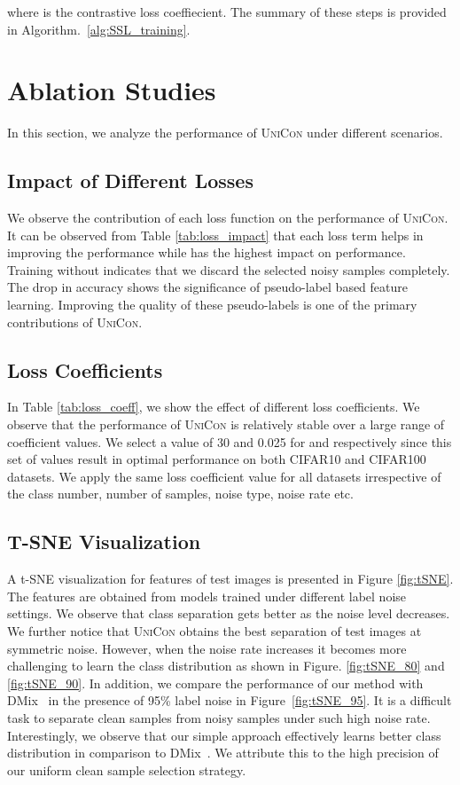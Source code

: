 \documentclass[10pt,twocolumn,letterpaper]{article}
\begin{document}
where  is the contrastive loss coeffiecient. The summary of these steps is provided in Algorithm.~\ref{alg:SSL_training}.

\section{Ablation Studies} \label{sec:ablation_studies}
In this section, we analyze the performance of \textsc{UniCon} under different scenarios.

\subsection{Impact of Different Losses}
We observe the contribution of each loss function on the performance of \textsc{UniCon}. It can be observed from Table \ref{tab:loss_impact} that each loss term helps in improving the performance while  has the highest impact on performance. Training without  indicates that we discard the selected noisy samples completely. The drop in accuracy shows the significance of pseudo-label based feature learning. Improving the quality of these pseudo-labels is one of the primary contributions of \textsc{UniCon}.    



\subsection{Loss Coefficients}
In Table \ref{tab:loss_coeff}, we show the effect of different loss coefficients. We observe that the performance of \textsc{UniCon} is relatively stable over a large range of coefficient values. We select a value of 30 and 0.025 for  and  respectively since this set of values result in optimal performance on both CIFAR10 and CIFAR100 datasets. We apply the same loss coefficient value for all datasets irrespective of the class number, number of samples, noise type, noise rate etc.    



\subsection{T-SNE Visualization}
A t-SNE visualization\cite{van2008visualizing} for features of test images is presented in Figure \ref{fig:tSNE}. The features are obtained from models trained under different label noise settings. We observe that class separation gets better as the noise level decreases. We further notice that \textsc{UniCon} obtains the best separation of test images at symmetric  noise. However, when the noise rate increases it becomes more challenging to learn the class distribution as shown in Figure. \ref{fig:tSNE_80} and \ref{fig:tSNE_90}. In addition, we compare the performance of our method with DMix~\cite{li2020dividemix} in the presence of 95\% label noise in Figure~\ref{fig:tSNE_95}. It is a difficult task to separate clean samples from noisy samples under such high noise rate. Interestingly, we observe that our simple approach effectively learns better class distribution in comparison to DMix~\cite{li2020dividemix}. We attribute this to the high precision of our uniform clean sample selection strategy.  
\end{document}

